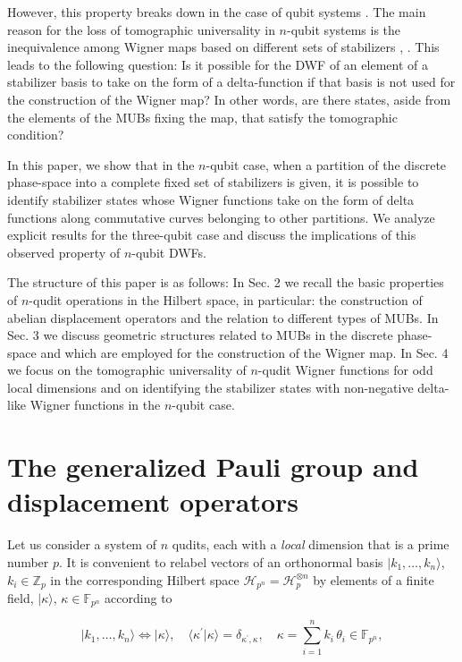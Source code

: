 \documentclass[quantumrep,article,submit,pdftex,moreauthors]{Definitions/mdpi}
\begin{document}
However, this property breaks down in the case of qubit systems \cite{UniqueWF,
cohomo,contextMagic}. The main reason for the loss of tomographic universality
in $n$-qubit systems is the inequivalence among Wigner maps based on different
sets of stabilizers \cite{Bjork2007}, \cite{qip17}. This leads to the following
question: Is it possible for the DWF of an element of a stabilizer basis to take
on the form of a delta-function if that basis is not used for the construction
of the Wigner map? In other words, are there states, aside from the elements of
the MUBs fixing the map, that satisfy the tomographic condition?

In this paper, we show that in the $n$-qubit case, when a partition of the
discrete phase-space into a complete fixed set of stabilizers is given, it is
possible to identify stabilizer states whose Wigner functions take on the form
of delta functions along commutative curves belonging to other partitions. We
analyze explicit results for the three-qubit case and discuss the implications
of this observed property of $n$-qubit DWFs.

The structure of this paper is as follows: In Sec. 2 we recall the basic
properties of $n$-qudit operations in the Hilbert space, in particular: the
construction of abelian displacement operators and the relation to different
types of MUBs. In Sec. 3 we discuss geometric structures related to MUBs in the
discrete phase-space and which are employed for the construction of the Wigner
map. In Sec. 4 we focus on the tomographic universality of $n$-qudit Wigner
functions for odd local dimensions and on identifying the stabilizer states with
non-negative delta-like Wigner functions in the $n$-qubit case.


\section{The generalized Pauli group and displacement operators}

Let us consider a system of $n$ qudits, each with a \textit{local} dimension
that is a prime number $p$. It is convenient to relabel vectors of an
orthonormal basis $|k_{1},\ldots,k_{n}\rangle$, $k_{i} \in \mathbb{Z}_{p}$ in
the corresponding Hilbert space $\mathcal{H}_{p^{n}}=\mathcal{H}_{p}^{\otimes
n}$ by elements of a finite field, $|\kappa\rangle$, $\kappa \in
\mathbb{F}_{p^{n}}$ according to

\begin{equation}
  |k_{1},\ldots,k_{n}\rangle
  \Leftrightarrow |\kappa\rangle,
  \quad \langle\kappa^{\prime}|\kappa\rangle
  = \delta_{\kappa^{\prime},\kappa},
  \quad \kappa
  = \sum_{i=1}^{n} k_{i} \, \theta_{i} \in \mathbb{F}_{p^{n}},
  \label{basis}
\end{equation}
\end{document}

